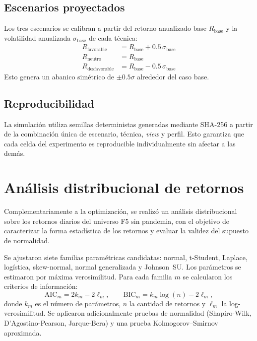 \subsection{Escenarios proyectados}

Los tres escenarios se calibran a partir del retorno anualizado base
$R_{\text{base}}$ y la volatilidad anualizada $\sigma_{\text{base}}$ de cada
t\'ecnica:
\begin{align}
R_{\text{favorable}} &= R_{\text{base}} + 0.5\,\sigma_{\text{base}} \\
R_{\text{neutro}} &= R_{\text{base}} \\
R_{\text{desfavorable}} &= R_{\text{base}} - 0.5\,\sigma_{\text{base}}
\end{align}
Esto genera un abanico sim\'etrico de $\pm 0.5\sigma$ alrededor del caso
base.

\subsection{Reproducibilidad}

La simulaci\'on utiliza semillas deterministas generadas mediante SHA-256 a
partir de la combinaci\'on \'unica de escenario, t\'ecnica, \textit{view} y
perfil. Esto garantiza que cada celda del experimento es reproducible
individualmente sin afectar a las dem\'as.

\section{An\'alisis distribucional de retornos}

Complementariamente a la optimizaci\'on, se realiz\'o un an\'alisis
distribucional sobre los retornos diarios del universo F5 sin pandemia, con el
objetivo de caracterizar la forma estad\'istica de los retornos y evaluar la
validez del supuesto de normalidad.

Se ajustaron siete familias param\'etricas candidatas: normal, t-Student,
Laplace, log\'istica, skew-normal, normal generalizada y Johnson~SU. Los
par\'ametros se estimaron por m\'axima verosimilitud. Para cada familia $m$ se
calcularon los criterios de informaci\'on:
\begin{equation}
\text{AIC}_m = 2k_m - 2\ell_m, \qquad
\text{BIC}_m = k_m \log(n) - 2\ell_m,
\end{equation}
donde $k_m$ es el n\'umero de par\'ametros, $n$ la cantidad de retornos y
$\ell_m$ la log-verosimilitud. Se aplicaron adicionalmente pruebas de
normalidad (Shapiro-Wilk, D'Agostino-Pearson, Jarque-Bera) y una prueba
Kolmogorov--Smirnov aproximada.

